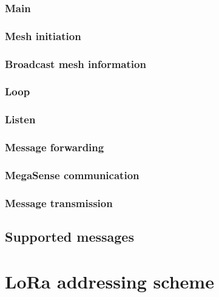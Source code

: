 			\subsubsection{Main}
			
			\subsubsection{Mesh initiation}
			
			\subsubsection{Broadcast mesh information}
			
			
			\subsubsection{Loop}
			
			\subsubsection{Listen}
			
			\subsubsection{Message forwarding}
			
			\subsubsection{MegaSense communication}
			
			\subsubsection{Message transmission}
			
		\subsection{Supported messages}
		
	\section{LoRa addressing scheme}\label{subsec:lora_addressing}

